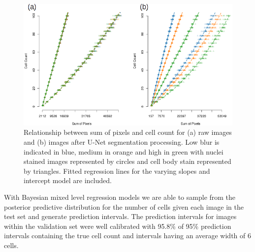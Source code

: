 \documentclass[isoft]{poster_class_UofC}
\begin{document}
\begin{poster}
             \vspace{1cm}
           \begin{figure}
            \centering
            \captionsetup{type=figure}
            \includegraphics[scale=1.7]{./images/rawVUnet.png}
            \caption{Relationship between sum of pixels and cell count for (a) raw images and (b) images after U-Net segmentation processing. Low blur is indicated in blue, medium in orange and high in green with nuclei stained images represented by circles and cell body stain represented by triangles. Fitted regression lines for the varying slopes and intercept model are included.}
            \label{fig:Results}
        \end{figure}   
            \vspace{1cm}
 With Bayesian mixed level regression models we are able to sample from the posterior predictive distribution for the number of cells given each image in the test set and generate prediction intervals. The prediction intervals for images within the validation set were well calibrated with 95.8\% of 95\% prediction intervals containing the true cell count and intervals having an average width of 6 cells.




\end{poster}
\end{document}
